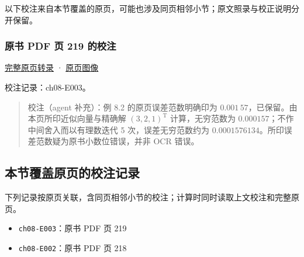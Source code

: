 \documentclass[
  10pt,
  fontset=fandol]{ctexart}
\providecommand{\tightlist}{%
  \setlength{\itemsep}{0pt}\setlength{\parskip}{0pt}}
\begin{document}
以下校注来自本节覆盖的原页，可能也涉及同页相邻小节；原文照录与校正说明分开保留。

\subsubsection{原书 PDF 页 219 的校注}\label{ux539fux4e66-pdf-ux9875-219-ux7684ux6821ux6ce8}

\href{../pages/pdf-219.md}{完整原页转录} · \href{../../source-images/pdf-219.jpeg}{原页图像}

校注记录：ch08-E003。

\begin{quote}
校注（agent 补充）：例 8.2 的原页误差范数明确印为 \(0.001\,57\)，已保留。由本页所印近似向量与精确解 \((3,2,1)^{\mathrm T}\) 计算，无穷范数为 \(0.000157\)；不作中间舍入而以有理数迭代 5 次，误差无穷范数约为 \(0.0001576134\)。所印误差范数疑为原书小数位错误，并非 OCR 错误。
\end{quote}

\subsection{本节覆盖原页的校注记录}\label{ux672cux8282ux8986ux76d6ux539fux9875ux7684ux6821ux6ce8ux8bb0ux5f55}

下列记录按原页关联，含同页相邻小节的校注；计算时同时读取上文校注和完整原页。

\begin{itemize}
\tightlist
\item
  \texttt{ch08-E003}：原书 PDF 页 219
\item
  \texttt{ch08-E002}：原书 PDF 页 218
\end{itemize}
\end{document}
